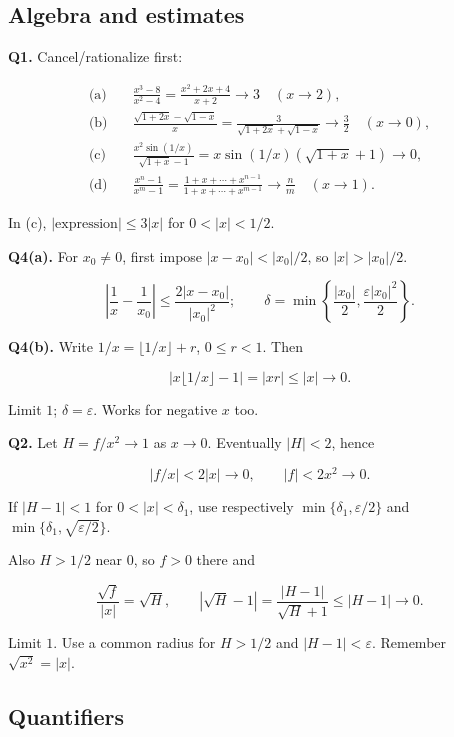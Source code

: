 \documentclass[11pt,a4paper]{article}
\begin{document}
\subsection{Algebra and estimates}\label{algebra-and-estimates}

\textbf{Q1.} Cancel/rationalize first:

\[
\begin{aligned}
\text{(a)}\quad &\frac{x^3-8}{x^2-4}=\frac{x^2+2x+4}{x+2}\to3\quad(x\to2),\\
\text{(b)}\quad &\frac{\sqrt{1+2x}-\sqrt{1-x}}x
=\frac3{\sqrt{1+2x}+\sqrt{1-x}}\to\frac32\quad(x\to0),\\
\text{(c)}\quad &\frac{x^2\sin(1/x)}{\sqrt{1+x}-1}
=x\sin(1/x)(\sqrt{1+x}+1)\to0,\\
\text{(d)}\quad &\frac{x^n-1}{x^m-1}
=\frac{1+x+\cdots+x^{n-1}}{1+x+\cdots+x^{m-1}}\to\frac nm\quad(x\to1).
\end{aligned}
\]

In (c), \(|\text{expression}|\le3|x|\) for \(0<|x|<1/2\).

\textbf{Q4(a).} For \(x_0\ne0\), first impose \(|x-x_0|<|x_0|/2\), so
\(|x|>|x_0|/2\).

\[
\left|\frac1x-\frac1{x_0}\right|\le\frac{2|x-x_0|}{|x_0|^2};\qquad
\delta=\min\left\{\frac{|x_0|}2,\frac{\varepsilon|x_0|^2}2\right\}.
\]

\textbf{Q4(b).} Write \(1/x=\lfloor1/x\rfloor+r\), \(0\le r<1\). Then

\[
\left|x\lfloor1/x\rfloor-1\right|=|xr|\le|x|\to0.
\]

Limit \(1\); \(\delta=\varepsilon\). Works for negative \(x\) too.

\textbf{Q2.} Let \(H=f/x^2\to1\) as \(x\to0\). Eventually \(|H|<2\),
hence

\[
|f/x|<2|x|\to0,\qquad |f|<2x^2\to0.
\]

If \(|H-1|<1\) for \(0<|x|<\delta_1\), use respectively
\(\min\{\delta_1,\varepsilon/2\}\) and
\(\min\{\delta_1,\sqrt{\varepsilon/2}\}\).

Also \(H>1/2\) near \(0\), so \(f>0\) there and

\[
\frac{\sqrt f}{|x|}=\sqrt H,\qquad
|\sqrt H-1|=\frac{|H-1|}{\sqrt H+1}\le|H-1|\to0.
\]

Limit \(1\). Use a common radius for \(H>1/2\) and
\(|H-1|<\varepsilon\). Remember \(\sqrt{x^2}=|x|\).

\subsection{Quantifiers}\label{quantifiers}
\end{document}
